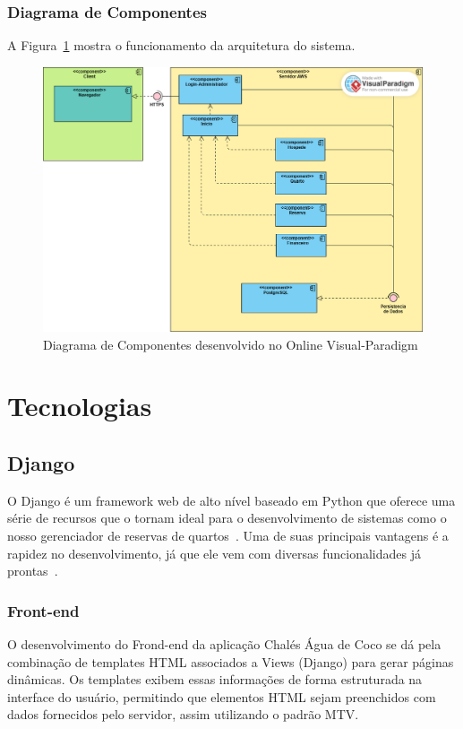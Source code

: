 \documentclass[
	12pt,				%
	openany,			%
	twoside,			%
	a4paper,			%
	english,			%
	french,				%
	spanish,			%
	brazil				%
	]{abntex2}
\begin{document}
\subsubsection{Diagrama de Componentes}
A Figura~\ref{fig:diagramacomponentes} mostra o funcionamento da arquitetura do sistema.

\begin{figure}[h!]
	\centering
	\includegraphics[width=\textwidth]{0406-Componentes.png}
	\caption{Diagrama de Componentes desenvolvido no Online Visual-Paradigm}
	\label{fig:diagramacomponentes}
\end{figure}


\section{Tecnologias}

\subsection{Django}

O Django é um framework web de alto nível baseado em Python que oferece uma série de recursos que o tornam ideal para o desenvolvimento de sistemas como o nosso gerenciador de reservas de quartos~\cite{python}. Uma de suas principais vantagens é a rapidez no desenvolvimento, já que ele vem com diversas funcionalidades já prontas~\cite{django}.

\subsubsection{Front-end}

O desenvolvimento do Frond-end da aplicação Chalés Água de Coco se dá pela combinação de templates HTML associados a Views (Django) para gerar páginas dinâmicas. Os templates exibem essas informações de forma estruturada na interface do usuário, permitindo que elementos HTML sejam preenchidos com dados fornecidos pelo servidor, assim utilizando o padrão MTV.
\end{document}
